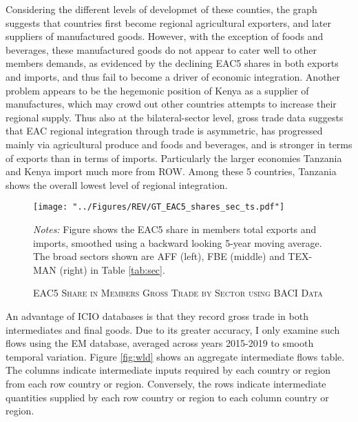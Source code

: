 \documentclass[a4paper]{article}
\begin{document}
Considering the different levels of developmet of these counties, the graph suggests that countries first become regional agricultural exporters, and later suppliers of manufactured goods. However, with the exception of foods and beverages, these manufactured goods do not appear to cater well to other members demands, as evidenced by the declining EAC5 shares in both exports and imports, and thus fail to become a driver of economic integration. Another problem appears to be the hegemonic position of Kenya as a supplier of manufactures, which may crowd out other countries attempts to increase their regional supply. Thus also at the bilateral-sector level, gross trade data suggests that EAC regional integration through trade is asymmetric, has progressed mainly via agricultural produce and foods and beverages, and is stronger in terms of exports than in terms of imports. %
Particularly the larger economies Tanzania and Kenya import much more from ROW. Among these 5 countries, Tanzania shows the overall lowest level of regional integration. 

\begin{figure}[h!] \vspace{-3mm}
\centering
\caption{\label{fig:GTEACsharesSec}\textsc{EAC5 Share in Members Gross Trade by Sector using BACI Data}}
\texttt{[image: "../Figures/REV/GT\_EAC5\_shares\_sec\_ts.pdf"]} %
\raggedright
\scriptsize 
\emph{Notes:} Figure shows the EAC5 share in members total exports and imports, smoothed using a backward looking 5-year moving average. The broad sectors shown are AFF (left), FBE (middle) and TEX-MAN (right) in Table \ref{tab:sec}.
\end{figure}
\FloatBarrier

An advantage of ICIO databases is that they record gross trade in both intermediates and final goods. Due to its greater accuracy, I only examine such flows using the EM database, averaged across years 2015-2019 to smooth temporal variation. Figure \ref{fig:wld} shows an aggregate intermediate flows table. The columns indicate intermediate inputs required by each country or region from each row country or region. Conversely, the rows indicate intermediate quantities supplied by each row country or region to each column country or region. \newline %
\end{document}
